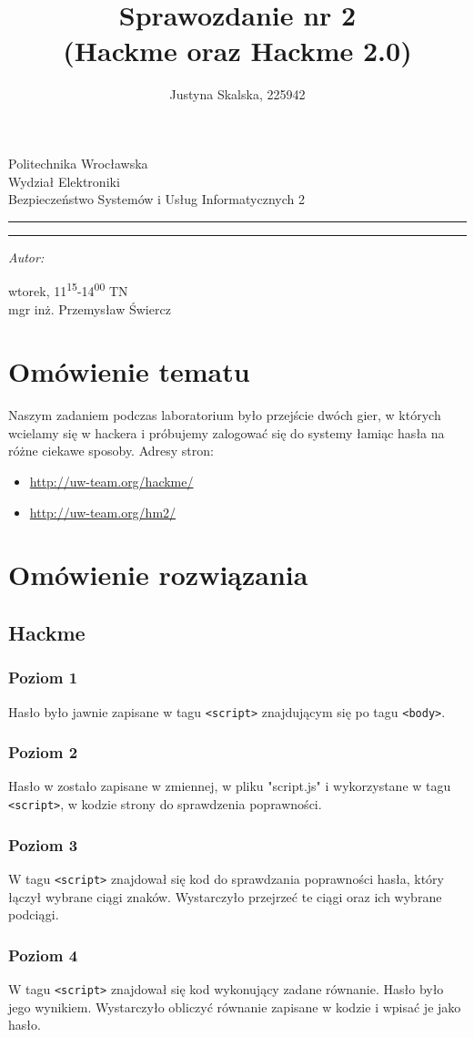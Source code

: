 \documentclass[12pt,a4paper,titlepage]{article}
\author{Justyna Skalska, 225942}
\title{Sprawozdanie nr 2\\
(Hackme oraz Hackme 2.0)}
\makeatletter
\newcommand{\linia}{\rule{\linewidth}{0.4mm}}
\renewcommand{\maketitle}{\begin{titlepage}
    \vspace*{1cm}
    \begin{center}\small
    Politechnika Wrocławska\\
    Wydział Elektroniki\\
    Bezpieczeństwo Systemów i Usług Informatycznych 2
    \end{center}
    \vspace{3cm}
    \noindent\linia
    \begin{center}
      \LARGE \textsc{\@title}
         \end{center}
     \linia
    \vspace{0.5cm}
    \begin{flushright}
    \begin{minipage}{7cm}
    \textit{\small Autor:}\\
    \normalsize \textsc{\@author} \par
    \end{minipage}
    \vspace{5cm}

     {\small wtorek, 11\textsuperscript{15}-14\textsuperscript{00} TN}\\
        mgr inż. Przemysław Świercz
     \end{flushright}
    \vspace*{\stretch{6}}
    \begin{center}
    \@date
    \end{center}
  \end{titlepage}%
}
\makeatother
\begin{document}
\maketitle

\section{Omówienie tematu}
Naszym zadaniem podczas laboratorium było przejście dwóch gier, w których wcielamy się w hackera i próbujemy zalogować się do systemy łamiąc hasła na różne ciekawe sposoby. Adresy stron:
\begin{itemize}
    \item \url{http://uw-team.org/hackme/}
    \item \url{http://uw-team.org/hm2/}
\end{itemize}

\section{Omówienie rozwiązania}

\subsection{Hackme}
\subsubsection{Poziom 1}
Hasło było jawnie zapisane w tagu \texttt{<script>} znajdującym się po tagu \texttt{<body>}.
\subsubsection{Poziom 2}
Hasło w zostało zapisane w zmiennej, w pliku "script.js" i wykorzystane w tagu \texttt{<script>}, w kodzie strony do sprawdzenia poprawności.
\subsubsection{Poziom 3}
W tagu \texttt{<script>} znajdował się kod do sprawdzania poprawności hasła, który łączył wybrane ciągi znaków. Wystarczyło przejrzeć te ciągi oraz ich wybrane podciągi.
\subsubsection{Poziom 4}
W tagu \texttt{<script>} znajdował się kod wykonujący zadane równanie. Hasło było jego wynikiem. Wystarczyło obliczyć równanie zapisane w kodzie i wpisać je jako hasło.
\end{document}
